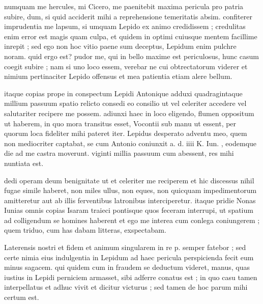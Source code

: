 


 numquam me hercules, mi Cicero, me paenitebit maxima pericula pro patria subire, dum, si quid acciderit mihi a reprehensione temeritatis absim. confiterer imprudentia me lapsum, si umquam Lepido ex animo credidissem ; credulitas enim error est magis quam culpa, et quidem in optimi cuiusque mentem facillime inrepit ; sed ego non hoc vitio paene sum deceptus, Lepidum enim pulchre noram. quid ergo est? pudor me, qui in bello maxime est periculosus, hunc casum coegit subire ; nam si uno loco essem, verebar ne cui obtrectatorum viderer et nimium pertinaciter Lepido offensus et mea patientia etiam alere bellum.

 itaque copias prope in conspectum Lepidi Antonique adduxi quadragintaque millium passuum spatio relicto consedi eo consilio ut vel celeriter accedere vel salutariter recipere me possem. adiunxi haec in loco eligendo, flumen oppositum ut haberem, in quo mora transitus esset, Vocontii sub manu ut essent, per quorum loca fideliter mihi pateret iter. Lepidus desperato adventu meo, quem non mediocriter captabat, se cum Antonio coniunxit a. d. iiii K. Iun. , eodemque die ad me castra moverunt. viginti millia passuum cum abessent, res mihi nuntiata est.

 dedi operam deum benignitate ut et celeriter me reciperem et hic discessus nihil fugae simile haberet, non miles ullus, non eques, non quicquam impedimentorum amitteretur aut ab illis ferventibus latronibus interciperetur. itaque pridie Nonas Iunias omnis copias Isaram traieci pontisque quos feceram interrupi, ut spatium ad colligendum se homines haberent et ego me interea cum conlega coniungerem ; quem triduo, cum has dabam litteras, exspectabam.

 Laterensis nostri et fidem et animum singularem in re p. semper fatebor ; sed certe nimia eius indulgentia in Lepidum ad haec pericula perspicienda fecit eum minus sagacem. qui quidem cum in fraudem se deductum videret, manus, quas iustius in Lepidi perniciem armasset, sibi adferre conatus est ; in quo casu tamen interpellatus et adhuc vivit et dicitur victurus ; sed tamen de hoc parum mihi certum est.

